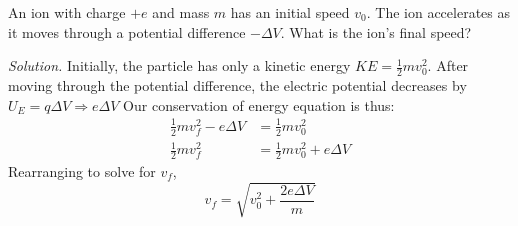 \documentclass[12pt, titlepage]{article}
\begin{document}
\begin{Problem}
    An ion with charge $+e$ and mass $m$ has an initial speed $v_0$. The ion accelerates as it moves through a potential difference $-\Delta V$. What is the ion’s final speed?

    \tcblower

    \textit{Solution. }Initially, the particle has only a kinetic energy $KE = \frac{1}{2}mv_0^2$. After moving through the potential difference, the electric potential decreases by $U_E = q\Delta V \Rightarrow e\Delta V$ Our conservation of energy equation is thus:
    \begin{equation*}
        \begin{split}
            \frac{1}{2}mv_f^2-e\Delta V & =\frac{1}{2}mv_0^2 \\
            \frac{1}{2}mv_f^2 & =\frac{1}{2}mv_0^2 + e\Delta V
        \end{split}
    \end{equation*}
    Rearranging to solve for $v_f$,
    \begin{equation*}
        v_f= \sqrt{v_0^2+\frac{2e\Delta V}{m}}
    \end{equation*}
\end{Problem}
\end{document}
